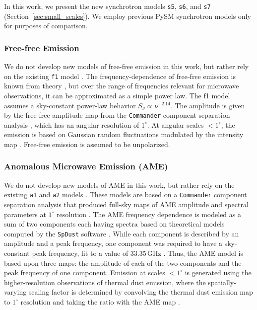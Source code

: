 \documentclass[twocolumn]{aastex631}
\begin{document}
In this work, we present the new synchrotron models \texttt{s5}, \texttt{s6}, and \texttt{s7} (Section~\ref{sec:small_scales}). We employ previous PySM synchrotron models only for purposes of comparison.

\subsubsection{Free-free Emission}
We do not develop new models of free-free emission in this work, but rather rely on the existing \texttt{f1} model \citep{Thorne:2017}. The frequency-dependence of free-free emission is known from theory \citep[][and references therein]{Draine:2011}, but over the range of frequencies relevant for microwave observations, it can be approximated as a simple power law. The f1 model assumes a sky-constant power-law behavior $S_\nu \propto \nu^{-2.14}$. The amplitude is given by the free-free amplitude map from the \texttt{Commander} component separation analysis \citep{planck2014-a12}, which has an angular resolution of $1^\circ$. At angular scales $<1^\circ$, the emission is based on Gaussian random fluctuations modulated by the intensity map \citep[see][for details]{Thorne:2017}. Free-free emission is assumed to be unpolarized.

\subsubsection{Anomalous Microwave Emission (AME)}
We do not develop new models of AME in this work, but rather rely on the existing \texttt{a1} and \texttt{a2} models \citep{Thorne:2017}. These models are based on a \texttt{Commander} component separation analysis that produced full-sky maps of AME amplitude and spectral parameters at $1^\circ$ resolution \citep{planck2014-a12}. The AME frequency dependence is modeled as a sum of two components each having spectra based on theoretical models computed by the \texttt{SpDust} software \citep{Ali-Haimoud:2009, Silsbee:2011}. While each component is described by an amplitude and a peak frequency, one component was required to have a sky-constant peak frequency, fit to a value of 33.35\,GHz \citep{planck2014-a12}. Thus, the AME model is based upon three maps: the amplitude of each of the two components and the peak frequency of one component. Emission at scales $<1^\circ$ is generated using the higher-resolution observations of thermal dust emission, where the spatially-varying scaling factor is determined by convolving the thermal dust emission map to $1^\circ$ resolution and taking the ratio with the AME map \citep{Thorne:2017}.
\end{document}
